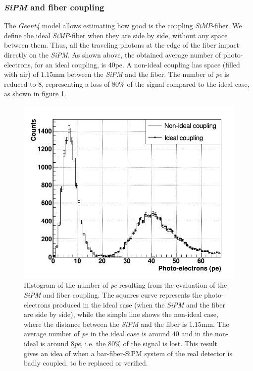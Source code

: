 \documentclass[submitting]{nst}
\begin{document}
\subsubsection{ \textsl{SiPM} and fiber coupling}%
The \textsl{Geant4} model allows estimating how good is the coupling \textsl{SiMP}-fiber. We define the ideal \textsl{SiMP}-fiber when they are side by side, without any space between them. Thus, all the traveling photons at the edge of the fiber impact directly on the \textsl{SiPM}. As shown above, the obtained average number of photo-electrons, for an ideal coupling, is $40$pe. A non-ideal coupling has space (filled with air) of $1.15$mm between the \textsl{SiPM} and the fiber. The number of \textsl{pe} is reduced to $8$, representing a loss of 80\% of the signal compared to the ideal case, as shown in figure \ref{coupling}.
%
%
\begin{figure}
    \centering
    \includegraphics[scale=0.41]{Figures/coupling.png}
    \caption{Histogram of the number of \textsl{pe} resulting from the evaluation of the \textsl{SiPM} and fiber coupling. The squares curve represents the photo-electrons produced in the ideal case (when the \textsl{SiPM} and the fiber are side by side), while the simple line shows the non-ideal case, where the distance between the \textsl{SiPM} and the fiber is $1.15$mm. The average number of \textsl{pe} in the ideal case is around $40$ and in the non-ideal is around $8$\textsl{pe}, i.e. the $80$\% of the signal is lost. This result gives an idea of when a bar-fiber-SiPM system of the real detector is badly coupled, to be replaced or verified.}
    \label{coupling}
\end{figure}
\end{document}
